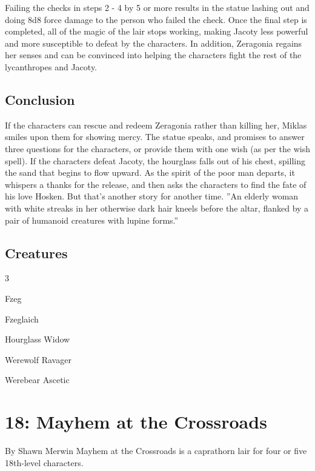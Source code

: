 \documentclass[10pt,a4paper,twoside,twocolumn,openany,bg=print,nodeprecatedcode]{dndbook}
\begin{document}
Failing the checks in steps 2 - 4 by 5 or more results in the statue lashing out and doing 8d8 force damage to the person who failed the check.
Once the final step is completed, all of the magic of the lair stops working, making Jacoty less powerful and more susceptible to defeat by the characters. In addition, Zeragonia regains her senses and can be convinced into helping the characters fight the rest of the lycanthropes and Jacoty.
\section{Conclusion}
If the characters can rescue and redeem Zeragonia rather than killing her, Miklas smiles upon them for showing mercy. The statue speaks, and promises to answer three questions for the characters, or provide them with one wish (as per the wish spell).
If the characters defeat Jacoty, the hourglass falls out of his chest, spilling the sand that begins to flow upward. As the spirit of the poor man departs, it whispers a thanks for the release, and then asks the characters to find the fate of his love Hosken. But that's another story for another time.
\DndQuote%
{}
{''An elderly woman with white streaks in her otherwise dark hair kneels before the altar, flanked by a pair of humanoid creatures with lupine forms.''}
{}
\section{Creatures}

\begin{itemize}
\begin{multicols}{3}
\item Fzeg
\item Fzeglaich
\item Hourglass Widow
\item Werewolf Ravager
\item Werebear Ascetic
\end{multicols}

\end{itemize}

\chapter{18: Mayhem at the Crossroads}
By Shawn Merwin
Mayhem at the Crossroads is a caprathorn lair for four or five 18th-level characters.
\end{document}

